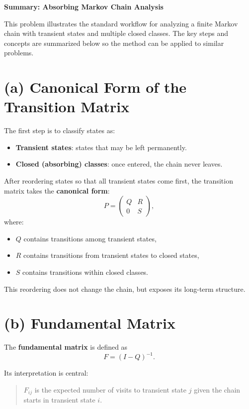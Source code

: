 \documentclass[11pt]{article}
\begin{document}
\begin{center}
    {\Large \textbf{Summary: Absorbing Markov Chain Analysis}}\\[0.5em]
\end{center}

This problem illustrates the standard workflow for analyzing a finite Markov chain with transient states and multiple closed classes.  
The key steps and concepts are summarized below so the method can be applied to similar problems.

\section*{(a) Canonical Form of the Transition Matrix}

The first step is to classify states as:
\begin{itemize}[leftmargin=2em]
    \item \textbf{Transient states}: states that may be left permanently.
    \item \textbf{Closed (absorbing) classes}: once entered, the chain never leaves.
\end{itemize}

After reordering states so that all transient states come first, the transition matrix takes the \textbf{canonical form}:
\[
P =
\begin{pmatrix}
Q & R \\
0 & S
\end{pmatrix},
\]
where:
\begin{itemize}[leftmargin=2em]
    \item $Q$ contains transitions among transient states,
    \item $R$ contains transitions from transient states to closed states,
    \item $S$ contains transitions within closed classes.
\end{itemize}

This reordering does not change the chain, but exposes its long-term structure.

\section*{(b) Fundamental Matrix}

The \textbf{fundamental matrix} is defined as
\[
F = (I - Q)^{-1}.
\]

Its interpretation is central:
\begin{quote}
$F_{ij}$ is the expected number of visits to transient state $j$ given the chain starts in transient state $i$.
\end{quote}
\end{document}
